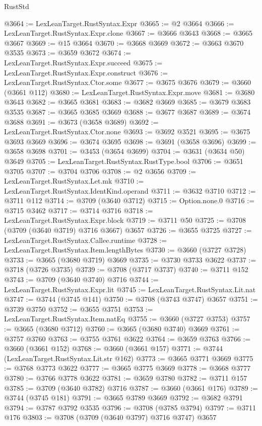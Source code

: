 \begin{lexlean}{RustStd}
\begin{coremodule}
@3664 := LexLeanTarget.RustSyntax.Expr
@3665 := @2 @3664
@3666 := LexLeanTarget.RustSyntax.Expr.clone
@3667 := @3666 @3643
@3668 := @3665 @3667
@3669 := @15 @3664
@3670 := @3668 @3669
@3672 := @3663 @3670 @3535
@3673 := @3659 @3672
@3674 := LexLeanTarget.RustSyntax.Expr.succeed
@3675 := LexLeanTarget.RustSyntax.Expr.construct
@3676 := LexLeanTarget.RustSyntax.Ctor.some
@3677 := @3675 @3676
@3679 := @3660 (@3661 @112)
@3680 := LexLeanTarget.RustSyntax.Expr.move
@3681 := @3680 @3643
@3682 := @3665 @3681
@3683 := @3682 @3669
@3685 := @3679 @3683 @3535
@3687 := @3665 @3685 @3669
@3688 := @3677 @3687
@3689 := @3674 @3688
@3691 := @3673 (@3658 @3689)
@3692 := LexLeanTarget.RustSyntax.Ctor.none
@3693 := @3692 @3521
@3695 := @3675 @3693 @3669
@3696 := @3674 @3695
@3698 := @3691 (@3658 @3696)
@3699 := @3658 @3698
@3701 := @3453 (@3654 @3699)
@3704 := @3631 (@3634 @50) @3649
@3705 := LexLeanTarget.RustSyntax.RustType.bool
@3706 := @3651 @3705
@3707 := @3704 @3706
@3708 := @2 @3656
@3709 := LexLeanTarget.RustSyntax.Let.mk
@3710 := LexLeanTarget.RustSyntax.IdentKind.operand
@3711 := @3632 @3710
@3712 := @3711 @112
@3714 := @3709 (@3640 @3712)
@3715 := Option.none.{0}
@3716 := @3715 @3462
@3717 := @3714 @3716
@3718 := LexLeanTarget.RustSyntax.Expr.block
@3719 := @3711 @50
@3725 := @3708 (@3709 (@3640 @3719) @3716 @3667) @3657
@3726 := @3655 @3725
@3727 := LexLeanTarget.RustSyntax.Callee.runtime
@3728 := LexLeanTarget.RustSyntax.Item.lengthBytes
@3730 := @3660 (@3727 @3728)
@3733 := @3665 (@3680 @3719) @3669
@3735 := @3730 @3733 @3622
@3737 := @3718 (@3726 @3735)
@3739 := @3708 (@3717 @3737)
@3740 := @3711 @152
@3743 := @3709 (@3640 @3740) @3716
@3744 := LexLeanTarget.RustSyntax.Expr.lit
@3745 := LexLeanTarget.RustSyntax.Lit.nat
@3747 := @3744 (@3745 @141)
@3750 := @3708 (@3743 @3747) @3657
@3751 := @3739 @3750
@3752 := @3655 @3751
@3753 := LexLeanTarget.RustSyntax.Item.natEq
@3755 := @3660 (@3727 @3753)
@3757 := @3665 (@3680 @3712)
@3760 := @3665 (@3680 @3740) @3669
@3761 := @3757 @3760
@3763 := @3755 @3761 @3622
@3764 := @3659 @3763
@3766 := @3660 (@3661 @152)
@3768 := @3660 (@3661 @157)
@3771 := @3744 (LexLeanTarget.RustSyntax.Lit.str @162)
@3773 := @3665 @3771 @3669
@3775 := @3768 @3773 @3622
@3777 := @3665 @3775 @3669
@3778 := @3668 @3777
@3780 := @3766 @3778 @3622
@3781 := @3659 @3780
@3782 := @3711 @157
@3785 := @3709 (@3640 @3782) @3716
@3787 := @3660 (@3661 @176)
@3789 := @3744 (@3745 @181)
@3791 := @3665 @3789 @3669
@3792 := @3682 @3791
@3794 := @3787 @3792 @3535
@3796 := @3708 (@3785 @3794)
@3797 := @3711 @176
@3803 := @3708 (@3709 (@3640 @3797) @3716 @3747) @3657

\end{coremodule}
\end{lexlean}
